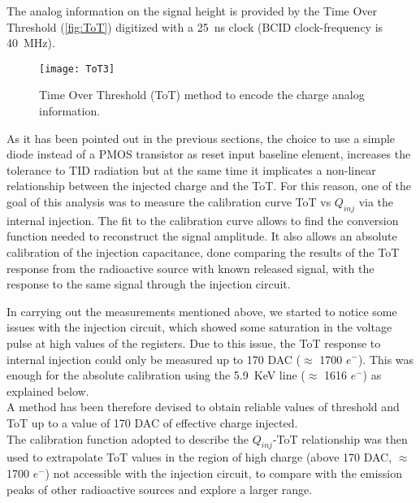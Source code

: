 The analog information on the signal height is provided by the Time Over Threshold (\autoref{fig:ToT}) digitized with a \SI{25}{ns} clock (BCID clock-frequency is \SI{40}{MHz}). 

\begin{figure}
\centering
\texttt{[image: ToT3]}
\caption{Time Over Threshold (ToT) method to encode the charge analog information.}
\label{fig:ToT}
\end{figure}

As it has been pointed out in the previous sections, the choice to use a simple diode instead of a PMOS transistor as reset input baseline element, increases the tolerance to TID radiation but at the same time it implicates a non-linear relationship between the injected charge and the ToT. For this reason, one of the goal of this analysis was to measure the calibration curve ToT vs $Q_{inj}$ via the internal injection. The fit to the calibration curve allows to find the conversion function needed to reconstruct the signal amplitude. It also allows an absolute calibration of the injection capacitance, done comparing the results of the ToT response from the radioactive source with known released signal, with the response to the same signal through the injection circuit.



In carrying out the measurements mentioned above, we started to notice some issues with the injection circuit, which showed some saturation in the voltage pulse at high values of the registers. Due to this issue, the ToT response to internal injection could only be measured up to 170 DAC ($\approx$ 1700 $e^{-}$). This was enough for the absolute calibration using the  \SI{5.9}{KeV} line ($\approx$ 1616 $e^{-}$) as explained below.\\

A method has been therefore devised to obtain reliable values of threshold and ToT up to a value of 170 DAC of effective charge injected.\\

The calibration function adopted to describe the $Q_{inj}$-ToT relationship was then used to extrapolate ToT values in the region of high charge (above 170 DAC, $\approx$ 1700 $e^{-}$) not accessible with the injection circuit, to compare with the emission peaks of other radioactive sources and explore a larger range.



